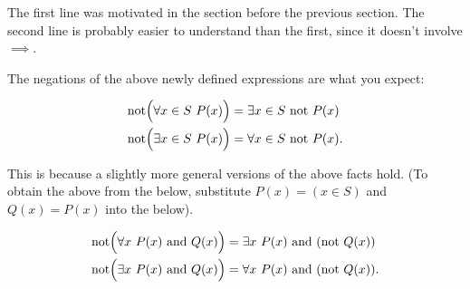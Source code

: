 The first line was motivated in the section before the previous section. The second line is probably easier to understand than the first, since it doesn't involve $\implies$.

The negations of the above newly defined expressions are what you expect:

\begin{align*}
    &\text{not}\Big( \forall x \in S \text{ } P(x) \Big) = \exists x \in S \text{ } \text{not } P(x) \\
    &\text{not}\Big( \exists x \in S \text{ } P(x) \Big) = \forall x \in S \text{ } \text{not } P(x).
\end{align*}

This is because a slightly more general versions of the above facts hold. (To obtain the above from the below, substitute $P(x) = (x \in S)$ and $Q(x) = P(x)$ into the below).

\begin{align*}
    &\text{not}\Big( \forall x \text{ } P(x) \text{ and } Q(x) \Big) = \exists x \text{ } P(x) \text{ and } (\text{not } Q(x)) \\
    &\text{not}\Big( \exists x \text{ } P(x) \text{ and } Q(x) \Big) = \forall x \text{ } P(x) \text{ and } (\text{not } Q(x)).
\end{align*}


